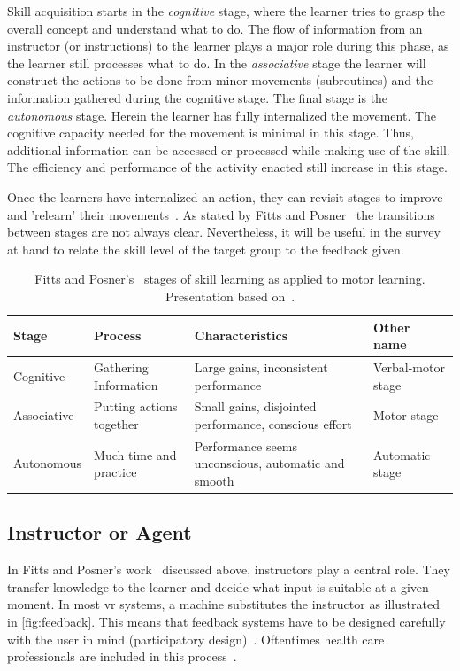 Skill acquisition starts in the \emph{cognitive} stage, where the learner tries to grasp the overall concept and understand what to do. The flow of information from an instructor (or instructions) to the learner plays a major role during this phase, as the learner still processes what to do. 
In the \emph{associative} stage the learner will construct the actions to be done from minor movements (subroutines) and the information gathered during the cognitive stage.
The final stage is the \emph{autonomous} stage. Herein the learner has fully internalized the movement. The cognitive capacity needed for the movement is minimal in this stage. Thus, additional information can be accessed or processed while making use of the skill. The efficiency and performance of the activity enacted still increase in this stage.

Once the learners have internalized an action, they can revisit stages to improve and 'relearn' their movements~\cite{huber2013AEP}. As stated by Fitts and Posner~\cite{fitts1967HPe} the transitions between stages are not always clear. Nevertheless, it will be useful in the survey at hand to relate the skill level of the target group to the feedback given.

\begin{table}[ht]
\caption[Fitts and Posner's~\cite{fitts1967HPe} stages of skill learning.]{Fitts and Posner's~\cite{fitts1967HPe} stages of skill learning as applied to motor learning. Presentation based on~\cite{huber2013AEP}.\label{table:1}}
\begin{tabular}{ |p{2.2cm}||p{2.6cm}|p{5.2cm}|p{2.2cm}|  }
    
 \hline
 Stage & Process & Characteristics & Other name\\
 \hline
 \hline
 Cognitive & \raggedright Gathering Information & \raggedright Large gains, inconsistent performance & Verbal-motor stage \\
 \hline
 Associative & \raggedright  Putting actions together & \raggedright Small gains, disjointed performance, conscious effort & Motor stage \\
 \hline
 Autonomous & Much time and practice & Performance seems unconscious, automatic and smooth & Automatic stage \\
 \hline
\end{tabular}
\label{table:stages}
\end{table}

\subsection{Instructor or Agent\label{sec:instructor}}
In Fitts and Posner's work~\cite{fitts1967HPe} discussed above, instructors play a central role. They transfer knowledge to the learner and decide what input is suitable at a given moment. In most \acrshort{vr} systems, a machine substitutes the instructor as illustrated in \autoref{fig:feedback}. This means that feedback systems have to be designed carefully with the user in mind (participatory design)~\cite{davies2003vrf}. Oftentimes health care professionals are included in this process~\cite{hilton2011dem}.

